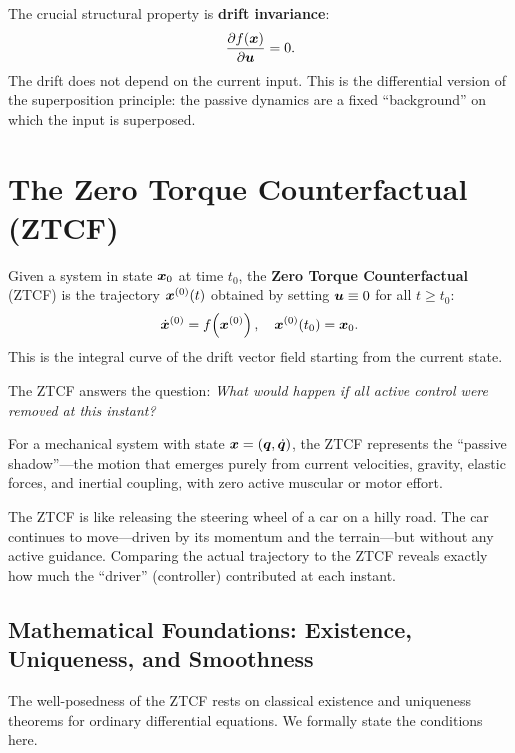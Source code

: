 The crucial structural property is \textbf{drift invariance}:
\begin{equation}
\frac{\partial f(\bm{x})}{\partial \bm{u}} = 0.
\label{eq:ch7:drift-invariance}
\end{equation}
The drift does not depend on the current input. This is the differential version of the
superposition principle: the passive dynamics are a fixed ``background'' on which the
input is superposed.

\section{The Zero Torque Counterfactual (ZTCF)}

\begin{definition}
\label{def:ch7:ZTCF}
Given a system in state $\bm{x}_0$ at time $t_0$, the \textbf{Zero Torque Counterfactual}
(ZTCF) is the trajectory $\bm{x}^{(0)}(t)$ obtained by setting $\bm{u}\equiv 0$ for all
$t\geq t_0$:
\begin{equation}
\dot{\bm{x}}^{(0)} = f\!\left(\bm{x}^{(0)}\right), \quad \bm{x}^{(0)}(t_0) = \bm{x}_0.
\label{eq:ch7:ZTCF}
\end{equation}
This is the integral curve of the drift vector field starting from the current state.
\end{definition}

The ZTCF answers the question: \emph{What would happen if all active control were
removed at this instant?}

For a mechanical system with state $\bm{x}=(\bm{q},\dot{\bm{q}})$, the ZTCF represents the ``passive
shadow''---the motion that emerges purely from current velocities, gravity, elastic
forces, and inertial coupling, with zero active muscular or motor effort.

\begin{intuitionbox}
The ZTCF is like releasing the steering wheel of a car on a hilly road. The car continues
to move---driven by its momentum and the terrain---but without any active guidance.
Comparing the actual trajectory to the ZTCF reveals exactly how much the ``driver''
(controller) contributed at each instant.
\end{intuitionbox}

\subsection{Mathematical Foundations: Existence, Uniqueness, and Smoothness}

The well-posedness of the ZTCF rests on classical existence and uniqueness theorems for
ordinary differential equations. We formally state the conditions here.

